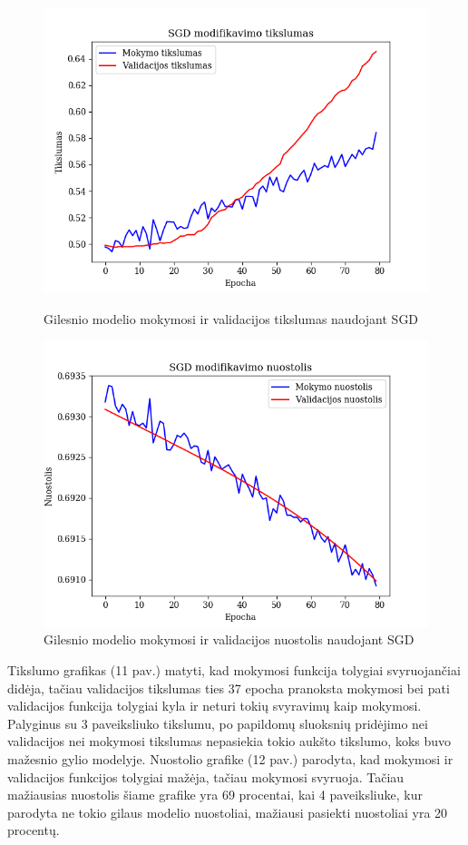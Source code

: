\documentclass{VUMIFPSkursinis}
\begin{document}
\begin{figure}[!htbp]
  \centering
  \begin{minipage}[b]{0.49\textwidth}
    \includegraphics[width=\textwidth]{img/AL/SGD_acc.png}
    \caption{Gilesnio modelio mokymosi ir validacijos tikslumas naudojant SGD}
  \end{minipage}
  \begin{minipage}[b]{0.49\textwidth}
    \includegraphics[width=\textwidth]{img/AL/SGD_loss.png}
    \caption{Gilesnio modelio mokymosi ir validacijos nuostolis naudojant SGD}
  \end{minipage}
\end{figure}

Tikslumo grafikas (11 pav.) matyti, kad mokymosi funkcija tolygiai svyruojančiai didėja, tačiau validacijos tikslumas ties 37 epocha pranoksta mokymosi bei pati validacijos funkcija tolygiai kyla ir neturi 
tokių svyravimų kaip mokymosi. Palyginus su 3 paveiksliuko tikslumu, po papildomų sluoksnių pridėjimo nei validacijos nei mokymosi tikslumas nepasiekia tokio aukšto tikslumo, koks buvo mažesnio gylio modelyje.
Nuostolio grafike (12 pav.) parodyta, kad mokymosi ir validacijos funkcijos tolygiai mažėja, tačiau mokymosi svyruoja. Tačiau mažiausias nuostolis šiame grafike yra 69 procentai, kai 4 paveiksliuke, kur parodyta 
ne tokio gilaus modelio nuostoliai, mažiausi pasiekti nuostoliai yra 20 procentų.
\end{document}

